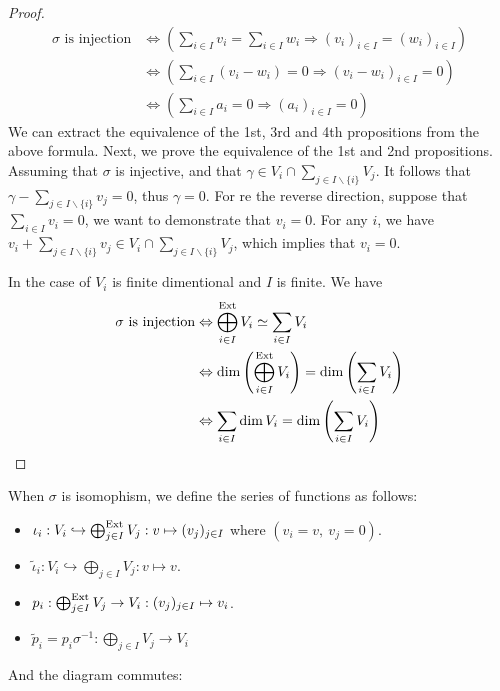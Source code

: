 \begin{proof}
    \[
        \begin{aligned}
            \sigma \textrm{ is injection} & \Leftrightarrow \left( \sum_{i \in I} v_i = \sum_{i \in I} w_i \Rightarrow (v_i)_{i \in I} = (w_i)_{i \in I} \right) \\
            & \Leftrightarrow \left( \sum_{i \in I} (v_i - w_i) = 0 \Rightarrow (v_i - w_i)_{i \in I} = 0\right) \\
            & \Leftrightarrow \left( \sum_{i \in I} a_i = 0 \Rightarrow (a_i)_{i \in I} = 0\right)
        \end{aligned} 
   \]
   We can extract the equivalence of the 1st, 3rd and 4th propositions from the above formula. Next, we prove the equivalence of the 1st and 2nd propositions. Assuming that $\sigma$ is injective, and that $\gamma \in V_i \cap \sum_{j \in I \smallsetminus \{i\}} V_j$. It follows that $\gamma - \sum_{j \in I \smallsetminus \{i\}} v_j = 0$, thus $\gamma = 0$. For re the reverse direction, suppose that $\sum_{i \in I} v_i = 0$, we want to demonstrate that $v_i = 0$. For any $i$, we have $v_i + \sum_{j \in I \smallsetminus \{i\}} v_j \in V_i \cap \sum_{j \in I \smallsetminus \{i\}} V_j$, which implies that $v_i = 0$.

   In the case of $V_i$ is finite dimentional and $I$ is finite. We have
    \begin{align*}
        \sigma \textrm{ is injection} & \Leftrightarrow \bigoplus^{\mathrm{Ext}}_{i \in I} V_i \simeq  \sum_{i \in I} V_i  \\
        & \Leftrightarrow \dim \left( \bigoplus^{\mathrm{Ext}}_{i \in I} V_i \right) = \dim \left( \sum_{i \in I} V_i  \right) \\
        & \Leftrightarrow \sum_{i \in I } \dim V_i = \dim \left( \sum_{i \in I} V_i  \right)
    \end{align*}
\end{proof}






When $\sigma$ is isomophism, we define the series of functions as follows:
\begin{itemize}
    \item $\iota_i: V_i \hookrightarrow \bigoplus^{\mathrm{Ext}}_{j \in I} V_j : v \mapsto (v_j)_{j \in I} $ where $(v_i = v,\ v_j = 0)$.
    \item $\tilde{\iota}_i: V_i \hookrightarrow \bigoplus_{j \in I}V_j : v \mapsto v$.
    \item $p_i : \bigoplus^{\mathrm{Ext}}_{j \in I} V_j \to V_i:  (v_j)_{j \in I} \mapsto v_i$.
    \item $\tilde{p}_i = p_i \sigma^{-1} : \bigoplus_{j \in I}V_j \to V_i$
\end{itemize}
And the diagram commutes:

